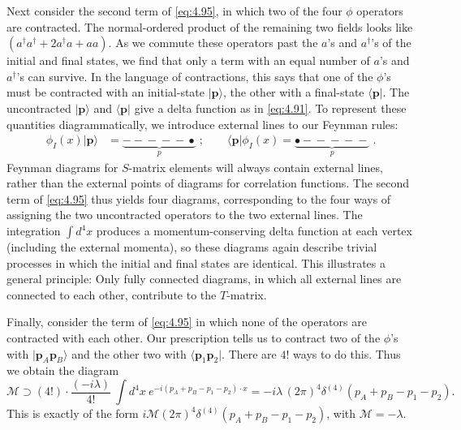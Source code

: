 Next consider the second term of \eqref{eq:4.95}, in which two of the four
$\phi$ operators are contracted.  The normal-ordered product of the remaining
two fields looks like $(a^\dagger a^\dagger + 2a^\dagger a + aa)$.  As we
commute these operators past the $a$'s and $a^\dagger$'s of the initial and
final states, we find that only a term with an equal number of $a$'s and
$a^\dagger$'s can survive.  In the language of contractions, this says that
one of the $\phi$'s must be contracted with an initial-state $|\mathbf{p}\rangle$,
the other with a final-state $\langle\mathbf{p}|$.  The uncontracted
$|\mathbf{p}\rangle$ and $\langle\mathbf{p}|$ give a delta function as in
\eqref{eq:4.91}.  To represent these quantities diagrammatically, we introduce
external lines to our Feynman rules:
\begin{equation}
  \begin{aligned}
    \phi_I(x)|\mathbf{p}\rangle &=
      \underbrace{-\!-\!-\!-\!-\!\bullet}_{p}\; ;
    \qquad
    \langle\mathbf{p}|\phi_I(x) =
      \underbrace{\bullet\!-\!-\!-\!-\!-\!}_{p}\; .
  \end{aligned}
  \label{eq:4.97}
\end{equation}
Feynman diagrams for $S$-matrix elements will always contain external lines,
rather than the external points of diagrams for correlation functions.  The
second term of \eqref{eq:4.95} thus yields four diagrams, corresponding to
the four ways of assigning the two uncontracted operators to the two external
lines.  The integration $\int d^4x$ produces a momentum-conserving delta
function at each vertex (including the external momenta), so these diagrams
again describe trivial processes in which the initial and final states are
identical.  This illustrates a general principle: Only fully connected
diagrams, in which all external lines are connected to each other, contribute
to the $T$-matrix.

Finally, consider the term of \eqref{eq:4.95} in which none of the operators
are contracted with each other.  Our prescription tells us to contract two of
the $\phi$'s with $|\mathbf{p}_A\mathbf{p}_B\rangle$ and the other two with
$\langle \mathbf{p}_1\mathbf{p}_2|$.  There are $4!$ ways to do this.  Thus we
obtain the diagram
\begin{equation}
  \mathcal{M} \supset (4!)\cdot \frac{(-i\lambda)}{4!}\
    \int d^4x\ e^{-i(p_A+p_B-p_1-p_2)\cdot x}
  = -i\lambda\,(2\pi)^4\delta^{(4)}(p_A+p_B-p_1-p_2) .
  \label{eq:4.98}
\end{equation}
This is exactly of the form $i\mathcal{M}(2\pi)^4\delta^{(4)}(p_A+p_B-p_1-p_2)$,
with $\mathcal{M} = -\lambda$.

